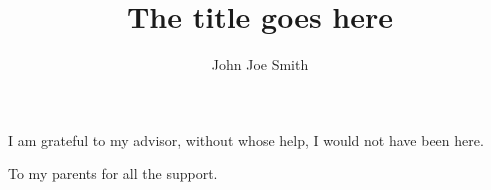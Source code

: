 \documentclass[oneside,final, letterpaper]{ucr}
\begin{document}

\title{The title goes here}
\author{John Joe Smith}

\maketitle
\copyrightpage{}
\approvalpage{}


\begin{frontmatter}

\begin{acknowledgements}
I am grateful to my advisor, without whose help, I would not have been here.
\end{acknowledgements}

\begin{dedication}
\null\vfil
{\large
\begin{center}
To my parents for all the support.
\end{center}}
\vfil\null
\end{dedication}



\tableofcontents
\listoffigures
\listoftables
\end{frontmatter}







\nocite{*}
% 



\end{document}
